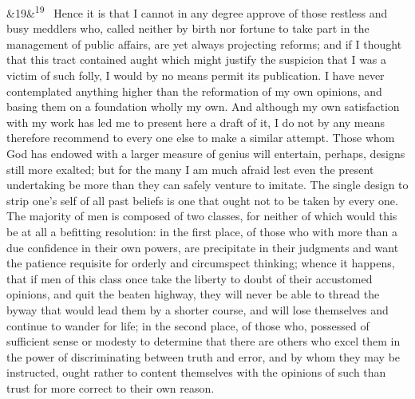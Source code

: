 \documentclass[12pt]{article}
\newcommand{\para}[1][]{\par\noindent\ifx&#1&\else\textsuperscript{\footnotesize #1}~\fi}
\begin{document}
\para[19] Hence it is that I cannot in any degree approve of those restless and busy meddlers who, called neither by birth nor fortune to take part in the management of public affairs, are yet always projecting reforms; and if I thought that this tract contained aught which might justify the suspicion that I was a victim of such folly, I would by no means permit its publication. I have never contemplated anything higher than the reformation of my own opinions, and basing them on a foundation wholly my own. And although my own satisfaction with my work has led me to present here a draft of it, I do not by any means therefore recommend to every one else to make a similar attempt. Those whom God has endowed with a larger measure of genius will entertain, perhaps, designs still more exalted; but for the many I am much afraid lest even the present undertaking be more than they can safely venture to imitate. The single design to strip one's self of all past beliefs is one that ought not to be taken by every one. The majority of men is composed of two classes, for neither of which would this be at all a befitting resolution: in the first place, of those who with more than a due confidence in their own powers, are precipitate in their judgments and want the patience requisite for orderly and circumspect thinking; whence it happens, that if men of this class once take the liberty to doubt of their accustomed opinions, and quit the beaten highway, they will never be able to thread the byway that would lead them by a shorter course, and will lose themselves and continue to wander for life; in the second place, of those who, possessed of sufficient sense or modesty to determine that there are others who excel them in the power of discriminating between truth and error, and by whom they may be instructed, ought rather to content themselves with the opinions of such than trust for more correct to their own reason.
\end{document}
